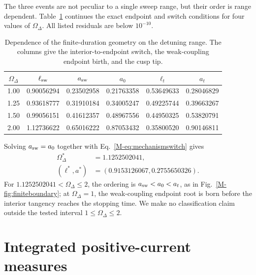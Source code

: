 \documentclass[reprint,superscriptaddress,floatfix,amsmath,amssymb,prresearch,aps]{revtex4-2}
\begin{document}
The three events are not peculiar to a single sweep range, but their order is
range dependent. Table~\ref{tab:rangedependence} continues the exact endpoint
and switch conditions for four values of \(\Omega_\Delta\). All listed
residuals are below \(10^{-10}\).
\begin{table}[t]
\caption{Dependence of the finite-duration geometry on the detuning range.
The columns give the interior-to-endpoint switch, the weak-coupling endpoint
birth, and the cusp tip.}
\label{tab:rangedependence}
\begin{ruledtabular}
\begin{tabular}{cccccc}
\(\Omega_\Delta\) & \(\ell_{\rm sw}\) & \(a_{\rm sw}\) & \(a_0\) &
\(\ell_t\) & \(a_t\)\\
\hline
1.00 & 0.90056294 & 0.23502958 & 0.21763358 & 0.53649633 & 0.28046829\\
1.25 & 0.93618777 & 0.31910184 & 0.34005247 & 0.49225744 & 0.39663267\\
1.50 & 0.99056151 & 0.41612357 & 0.48967556 & 0.44950325 & 0.53820791\\
2.00 & 1.12736622 & 0.65016222 & 0.87053432 & 0.35800520 & 0.90146811
\end{tabular}
\end{ruledtabular}
\end{table}
Solving \(a_{\rm sw}=a_0\) together with
Eq.~\eqref{M-eq:mechanismswitch} gives
\begin{equation}
\begin{aligned}
\Omega_\Delta^*&=1.1252502041,\\
(\ell^*,a^*)&=(0.9153126067,0.2755650326).
\end{aligned}
\label{eq:rangecrossover}
\end{equation}
For \(1.1252502041<\Omega_\Delta\leq2\), the ordering is
\(a_{\rm sw}<a_0<a_t\), as in Fig.~\ref{M-fig:finiteboundary}; at
\(\Omega_\Delta=1\), the weak-coupling endpoint root is born before the
interior tangency reaches the stopping time. We make no classification claim
outside the tested interval \(1\leq\Omega_\Delta\leq2\).


\section{Integrated positive-current measures}
\end{document}
